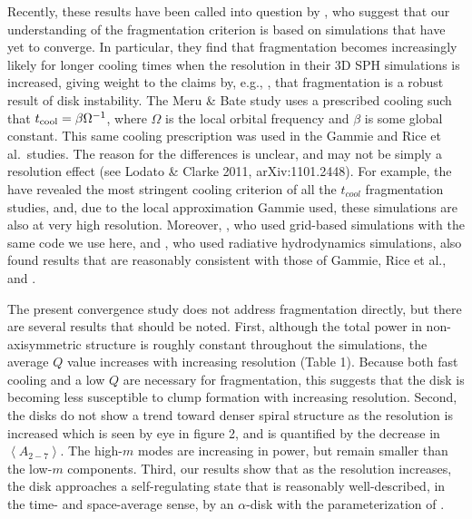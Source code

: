 \documentclass[manuscript]{aastex}
\begin{document}
Recently, these results have been called into question by \cite{meru2011a}, who suggest that our understanding of the
fragmentation criterion is based on simulations that have yet to converge.  In particular, they find that fragmentation
becomes increasingly likely for longer cooling times when the resolution in their 3D SPH simulations is increased,
giving weight to the claims by, e.g., \cite{boss2009}, that fragmentation is a robust result of disk instability. The
Meru \& Bate study uses a prescribed cooling such that $t_{\rm cool}=\beta\Omega^{-1}$, where $\Omega$ is the local
orbital frequency and $\beta$ is some global constant.  This same cooling prescription was used in the Gammie and Rice
et al.~studies.  The reason for the differences is unclear, and may not be simply a resolution effect (see Lodato \&
Clarke 2011, arXiv:1101.2448).  For example, the \cite{gammie2001} have revealed the most stringent cooling criterion of
all the $t_{cool}$ fragmentation studies, and, due to the local approximation Gammie used, these simulations are also at
very high resolution. Moreover, \cite{mejia2005}, who used grid-based simulations with the same code we use here, and  \cite{boley2008}, who used radiative hydrodynamics simulations, also found results that are reasonably consistent with those of Gammie, Rice et al., and \cite{cossins2010}. 

The present convergence study does not address fragmentation directly, but there are several results that should be noted.  First, although the total power in non-axisymmetric structure is roughly constant throughout the simulations, the average $Q$ value increases with increasing resolution (Table 1).  Because both fast cooling and a low $Q$ are necessary
for fragmentation, this suggests that the disk is becoming less susceptible to clump formation with increasing resolution.   Second, the disks do not show a trend toward denser spiral structure as the resolution is increased which is seen by eye in figure 2, and is quantified by the decrease in $\left<A_{2-7}\right>$.  The high-$m$ modes are increasing in power, but remain smaller than the low-$m$ components.   Third, our results show that as the resolution increases, the disk approaches a self-regulating state that is reasonably well-described, in the time- and space-average sense, by an $\alpha$-disk with the parameterization of \cite{gammie2001}. 
\end{document}
